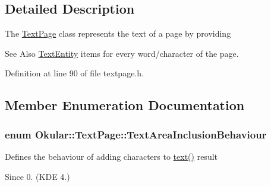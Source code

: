 \subsection{Detailed Description}
The \hyperlink{classOkular_1_1TextPage}{Text\+Page} class represents the text of a page by providing \begin{DoxySeeAlso}{See Also}
\hyperlink{classOkular_1_1TextEntity}{Text\+Entity} items for every word/character of the page. 
\end{DoxySeeAlso}


Definition at line 90 of file textpage.\+h.



\subsection{Member Enumeration Documentation}
\hypertarget{classOkular_1_1TextPage_a07b135c84863f18df1d08e95aeeffd34}{
\subsubsection[{Text\+Area\+Inclusion\+Behaviour}]{\setlength{\rightskip}{0pt plus 5cm}enum {\bf Okular\+::\+Text\+Page\+::\+Text\+Area\+Inclusion\+Behaviour}}}\label{classOkular_1_1TextPage_a07b135c84863f18df1d08e95aeeffd34}
Defines the behaviour of adding characters to \hyperlink{classOkular_1_1TextPage_a5af682e8df70faec3e9e23792e6ac6b7}{text()} result \begin{DoxySince}{Since}
0. (K\+D\+E 4.) 
\end{DoxySince}
